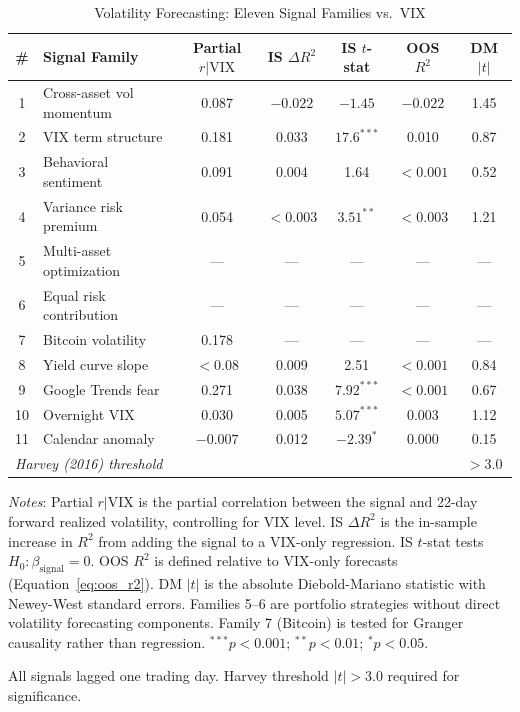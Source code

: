\documentclass[12pt,a4paper]{article}
\begin{document}
\begin{table}[H]
\centering
\small
\begin{threeparttable}
\caption{Volatility Forecasting: Eleven Signal Families vs.\ VIX}
\label{tab:main_results}
\begin{tabular}{@{}clccccc@{}}
\toprule
\# & Signal Family & Partial $r|\text{VIX}$ & IS $\Delta R^2$ & IS $t$-stat & OOS $R^2$ & DM $|t|$ \\
\midrule
1 & Cross-asset vol momentum & 0.087 & $-0.022$ & $-1.45$ & $-0.022$ & 1.45 \\
2 & VIX term structure & 0.181 & 0.033 & $17.6^{***}$ & 0.010 & 0.87 \\
3 & Behavioral sentiment & 0.091 & 0.004 & 1.64 & $<0.001$ & 0.52 \\
4 & Variance risk premium & 0.054 & $<0.003$ & $3.51^{**}$ & $<0.003$ & 1.21 \\
5 & Multi-asset optimization & --- & --- & --- & --- & --- \\
6 & Equal risk contribution & --- & --- & --- & --- & --- \\
7 & Bitcoin volatility & 0.178 & --- & --- & --- & --- \\
8 & Yield curve slope & $<0.08$ & 0.009 & 2.51 & $<0.001$ & 0.84 \\
9 & Google Trends fear & 0.271 & 0.038 & $7.92^{***}$ & $<0.001$ & 0.67 \\
10 & Overnight VIX & 0.030 & 0.005 & $5.07^{***}$ & 0.003 & 1.12 \\
11 & Calendar anomaly & $-0.007$ & 0.012 & $-2.39^{*}$ & 0.000 & 0.15 \\
\midrule
\multicolumn{2}{l}{\textit{Harvey (2016) threshold}} & & & & & $> 3.0$ \\
\bottomrule
\end{tabular}
\begin{tablenotes}
\small
\item \textit{Notes}: Partial $r|\text{VIX}$ is the partial correlation between the signal and 22-day forward realized volatility, controlling for VIX level. IS $\Delta R^2$ is the in-sample increase in $R^2$ from adding the signal to a VIX-only regression. IS $t$-stat tests $H_0: \beta_{\text{signal}} = 0$. OOS $R^2$ is defined relative to VIX-only forecasts (Equation~\ref{eq:oos_r2}). DM $|t|$ is the absolute Diebold-Mariano statistic with Newey-West standard errors. Families 5--6 are portfolio strategies without direct volatility forecasting components. Family 7 (Bitcoin) is tested for Granger causality rather than regression. $^{***}p<0.001$; $^{**}p<0.01$; $^{*}p<0.05$.
\item All signals lagged one trading day. Harvey threshold $|t|>3.0$ required for significance.
\end{tablenotes}
\end{threeparttable}
\end{table}
\end{document}
